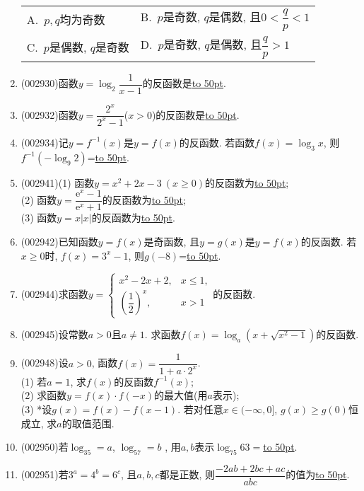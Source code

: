 \documentclass[10pt,a4paper]{article}
\newcommand{\blank}[1]{\underline{\hbox to #1pt{}}}
\newcommand{\twoch}[4]{\par\begin{tabular}{p{.46\textwidth}p{.46\textwidth}}
A.~#1& B.~#2\\
C.~#3& D.~#4
\end{tabular}}
\begin{document}
\begin{enumerate}[1.]
\begin{center}
\end{center}
\twoch{$p,q$均为奇数}{$p$是奇数, $q$是偶数, 且$0<\dfrac qp<1$}{$p$是偶数, $q$是奇数}{$p$是奇数, $q$是偶数, 且$\dfrac qp>1$}
\item {\tiny (002930)}函数$y=\log_2 \dfrac 1{x-1}$的反函数是\blank{50}.
\item {\tiny (002932)}函数$y=\dfrac{2^x}{{2^x}-1}$($x>0$)的反函数是\blank{50}.
\item {\tiny (002934)}记$y=f^{-1}(x)$是$y=f(x)$的反函数. 若函数$f(x)=\log_3x$, 则$f^{-1}(-\log_9 2)$=\blank{50}.
\item {\tiny (002941)}(1) 函数$y=x^2+2x-3\ (x\ge 0)$的反函数为\blank{50};\\
(2) 函数$y=\dfrac{\mathrm{e}^x-1}{{\mathrm{e}}^x+1}$的反函数为\blank{50};\\
(3) 函数$y=x|x|$的反函数为\blank{50}.
\item {\tiny (002942)}已知函数$y=f(x)$是奇函数, 且$y=g(x)$是$y=f(x)$的反函数. 若$x\ge 0$时, $f(x)=3^x-1$, 则$g(-8)$=\blank{50}.
\item {\tiny (002944)}求函数$y=\begin{cases}x^2-2x+2, & x\le 1,\\(\dfrac 12)^x, & x>1  \end{cases}$的反函数.
\item {\tiny (002945)}设常数$a>0$且$a\ne 1$. 求函数$f(x)=\log_a(x+\sqrt{x^2-1})$的反函数.
\item {\tiny (002948)}设$a>0$, 函数$f(x)=\dfrac 1{1+a\cdot 2^x}$.\\
(1) 若$a=1$, 求$f(x)$的反函数$f^{-1}(x)$;\\
(2) 求函数$y=f(x)\cdot f(-x)$的最大值(用$a$表示);\\
(3) *设$g(x)=f(x)-f(x-1)$. 若对任意$x\in (-\infty ,0]$, $g(x)\ge g(0)$恒成立, 求$a$的取值范围.
\item {\tiny (002950)}若$\log_35=a$, $\log_57=b$ , 用$a,b$表示$\log_{75}63=$\blank{50}.
\item {\tiny (002951)}若$3^a=4^b=6^c$, 且$a,b,c$都是正数, 则$\dfrac{-2ab+2bc+ac}{abc}$的值为\blank{50}.

\end{enumerate}
\end{document}

